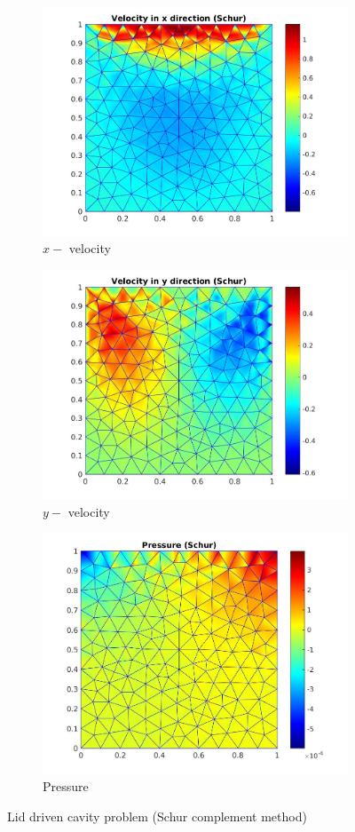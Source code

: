 \documentclass[a4paper,twoside,openright]{book}
\begin{document}
\begin{figure}
\begin{subfigure}{\textwidth}	
  \includegraphics[width=0.8\linewidth]{lid_schur_vx.jpg}
  \caption{$x-$ velocity} 
  \label{x_vel_stoke_schur_lid}
\end{subfigure}
\begin{subfigure}{\textwidth}	
  \includegraphics[width=0.8\linewidth]{lid_schur_vy.jpg}
    \caption{$y-$ velocity} 
    \label{y_vel_stoke_schur_lid}
\end{subfigure}
\begin{subfigure}{\textwidth}	
  \includegraphics[width=0.8\linewidth]{lid_schur_pressure.jpg}
    \caption{Pressure} 
    \label{pressure_stoke_schur_lid}
\end{subfigure}
\caption{Lid driven cavity problem (Schur complement method)}
\label{stoke_schur_lid}
\end{figure}
\end{document}
